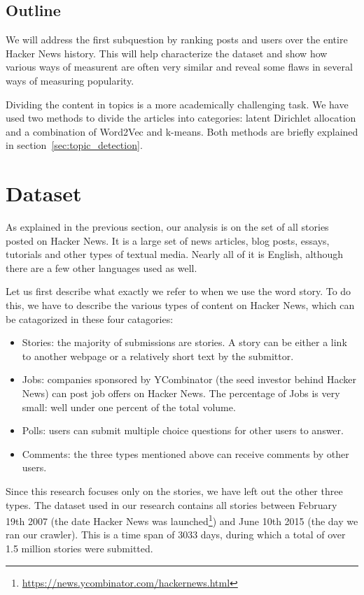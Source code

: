 \subsection{Outline}
We will address the first subquestion by ranking posts and users over the entire Hacker News history. This will help characterize the dataset and show how various ways of measurent are often very similar and reveal some flaws in several ways of measuring popularity.

Dividing the content in topics is a more academically challenging task. We have used two methods to divide the articles into categories: latent Dirichlet allocation and a combination of Word2Vec and k-means. Both methods are briefly explained in section~\ref{sec:topic_detection}.

\section{Dataset}
As explained in the previous section, our analysis is on the set of all stories posted on Hacker News. It is a large set of news articles, blog posts, essays, tutorials and other types of textual media. Nearly all of it is English, although there are a few other languages used as well.

Let us first describe what exactly we refer to when we use the word story. To do this, we have to describe the various types of content on Hacker News, which can be catagorized in these four catagories:
\begin{itemize}
\item Stories: the majority of submissions are stories. A story can be either a link to another webpage or a relatively short text by the submittor.
\item Jobs: companies sponsored by YCombinator (the seed investor behind Hacker News) can post job offers on Hacker News. The percentage of Jobs is very small: well under one percent of the total volume.
\item Polls: users can submit multiple choice questions for other users to answer.
\item Comments: the three types mentioned above can receive comments by other users.
\end{itemize}

Since this research focuses only on the stories, we have left out the other three types. The dataset used in our research contains all stories between February 19th 2007 (the date Hacker News was launched\footnote{\url{https://news.ycombinator.com/hackernews.html}}) and June 10th 2015 (the day we ran our crawler). This is a time span of 3033 days, during which a total of over 1.5 million stories were submitted.

